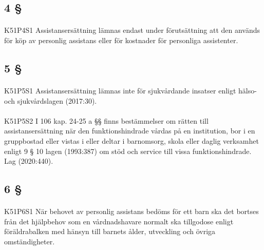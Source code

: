 \documentclass[a4paper,notitlepage,openany,10pt]{book}
\begin{document}
\subsection*{4 §}
\paragraph*{}
{\tiny K51P4S1}
Assistansersättning lämnas endast under förutsättning att den används för köp av personlig assistans eller för kostnader för personliga assistenter.
\subsection*{5 §}
\paragraph*{}
{\tiny K51P5S1}
Assistansersättning lämnas inte för sjukvårdande insatser enligt hälso- och sjukvårdslagen (2017:30).
\paragraph*{}
{\tiny K51P5S2}
I 106 kap. 24-25 a §§ finns bestämmelser om rätten till assistansersättning när den funktionshindrade vårdas på en institution, bor i en gruppbostad eller vistas i eller deltar i barnomsorg, skola eller daglig verksamhet enligt 9 § 10 lagen (1993:387) om stöd och service till vissa funktionshindrade.
Lag (2020:440).
\subsection*{6 §}
\paragraph*{}
{\tiny K51P6S1}
När behovet av personlig assistans bedöms för ett barn ska det bortses från det hjälpbehov som en vårdnadshavare normalt ska tillgodose enligt föräldrabalken med hänsyn till barnets ålder, utveckling och övriga omständigheter.
\end{document}

